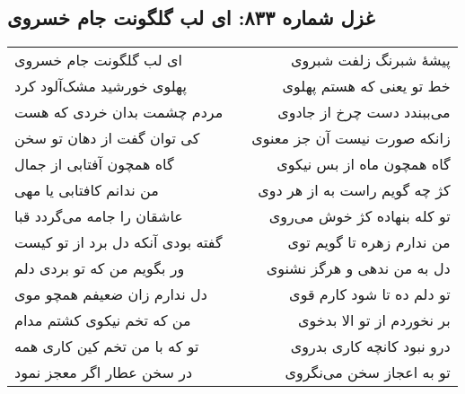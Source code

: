 \begin{center}
\section*{غزل شماره ۸۳۳: ای لب گلگونت جام خسروی}
\label{sec:833}
\begin{longtable}{l p{0.5cm} r}
ای لب گلگونت جام خسروی
&&
پیشهٔ شبرنگ زلفت شبروی
\\
پهلوی خورشید مشک‌آلود کرد
&&
خط تو یعنی که هستم پهلوی
\\
مردم چشمت بدان خردی که هست
&&
می‌ببندد دست چرخ از جادوی
\\
کی توان گفت از دهان تو سخن
&&
زانکه صورت نیست آن جز معنوی
\\
گاه همچون آفتابی از جمال
&&
گاه همچون ماه از بس نیکوی
\\
من ندانم کافتابی یا مهی
&&
کژ چه گویم راست به از هر دوی
\\
عاشقان را جامه می‌گردد قبا
&&
تو کله بنهاده کژ خوش می‌روی
\\
گفته بودی آنکه دل برد از تو کیست
&&
من ندارم زهره تا گویم توی
\\
ور بگویم من که تو بردی دلم
&&
دل به من ندهی و هرگز نشنوی
\\
دل ندارم زان ضعیفم همچو موی
&&
تو دلم ده تا شود کارم قوی
\\
من که تخم نیکوی کشتم مدام
&&
بر نخوردم از تو الا بدخوی
\\
تو که با من تخم کین کاری همه
&&
درو نبود کانچه کاری بدروی
\\
در سخن عطار اگر معجز نمود
&&
تو به اعجاز سخن می‌نگروی
\\
\end{longtable}
\end{center}
